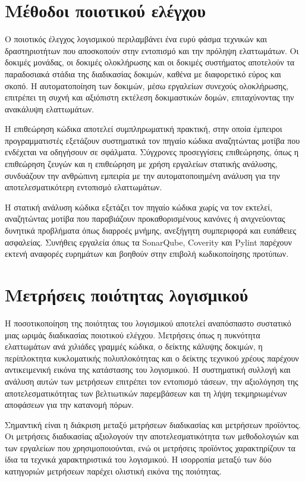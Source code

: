 \documentclass[
    language=greek,
    doctype=article,
]{../../omnilatex}
\begin{document}
\section{Μέθοδοι ποιοτικού ελέγχου}
Ο ποιοτικός έλεγχος λογισμικού περιλαμβάνει ένα ευρύ φάσμα τεχνικών και δραστηριοτήτων που αποσκοπούν στην εντοπισμό και την πρόληψη ελαττωμάτων. Οι δοκιμές μονάδας, οι δοκιμές ολοκλήρωσης και οι δοκιμές συστήματος αποτελούν τα παραδοσιακά στάδια της διαδικασίας δοκιμών, καθένα με διαφορετικό εύρος και σκοπό. Η αυτοματοποίηση των δοκιμών, μέσω εργαλείων συνεχούς ολοκλήρωσης, επιτρέπει τη συχνή και αξιόπιστη εκτέλεση δοκιμαστικών δομών, επιταχύνοντας την ανακάλυψη ελαττωμάτων.

Η επιθεώρηση κώδικα αποτελεί συμπληρωματική πρακτική, στην οποία έμπειροι προγραμματιστές εξετάζουν συστηματικά τον πηγαίο κώδικα αναζητώντας μοτίβα που ενδέχεται να οδηγήσουν σε σφάλματα. Σύγχρονες προσεγγίσεις επιθεώρησης, όπως η επιθεώρηση ζευγών και η επιθεώρηση με χρήση εργαλείων στατικής ανάλυσης, συνδυάζουν την ανθρώπινη εμπειρία με την αυτοματοποιημένη ανάλυση για την αποτελεσματικότερη εντοπισμό ελαττωμάτων.

Η στατική ανάλυση κώδικα εξετάζει τον πηγαίο κώδικα χωρίς να τον εκτελεί, αναζητώντας μοτίβα που παραβιάζουν προκαθορισμένους κανόνες ή ανιχνεύοντας δυνητικά προβλήματα όπως διαρροές μνήμης, ανεξήγητη συμπεριφορά και ευπάθειες ασφαλείας. Συνήθεις εργαλεία όπως τα SonarQube, Coverity και Pylint παρέχουν εκτενή αναφορές ευρημάτων και βοηθούν στην επιβολή κωδικοποίησης προτύπων.

\section{Μετρήσεις ποιότητας λογισμικού}
Η ποσοτικοποίηση της ποιότητας του λογισμικού αποτελεί αναπόσπαστο συστατικό μιας ωριμάς διαδικασίας ποιοτικού ελέγχου. Μετρήσεις όπως η πυκνότητα ελαττωμάτων ανά χιλιάδες γραμμές κώδικα, ο δείκτης κάλυψης δοκιμών, η περίπλοκτητα κυκλοματικής πολυπλοκότητας και ο δείκτης τεχνικού χρέους παρέχουν αντικειμενική εικόνα της κατάστασης του λογισμικού. Η συστηματική συλλογή και ανάλυση αυτών των μετρήσεων επιτρέπει τον εντοπισμό τάσεων, την αξιολόγηση της αποτελεσματικότητας των βελτιωτικών παρεμβάσεων και τη λήψη τεκμηριωμένων αποφάσεων για την κατανομή πόρων.

Σημαντική είναι η διάκριση μεταξύ μετρήσεων διαδικασίας και μετρήσεων προϊόντος. Οι μετρήσεις διαδικασίας αξιολογούν την αποτελεσματικότητα των μεθοδολογιών και των εργαλείων που χρησιμοποιούνται, ενώ οι μετρήσεις προϊόντος χαρακτηρίζουν τα ίδια τα τεχνικά χαρακτηριστικά του λογισμικού. Η ισορροπία μεταξύ των δύο κατηγοριών μετρήσεων παρέχει ολιστική εικόνα της ποιότητας.
\end{document}
